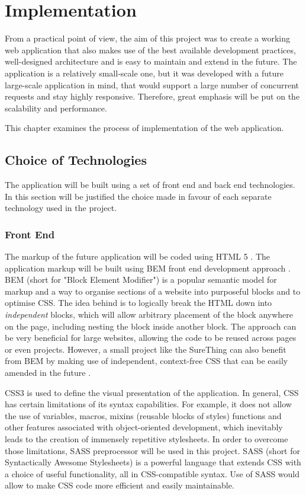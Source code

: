 \chapter{Implementation}
\label{ch:implementation}
From a practical point of view, the aim of this project was to create a working web application that also makes use of the best available development practices, well-designed architecture and is easy to maintain and extend in the future. The application is a relatively small-scale one, but it was developed with a future large-scale application in mind, that would support a large number of concurrent requests and stay highly responsive. Therefore, great emphasis will be put on the scalability and performance.  

This chapter examines the process of implementation of the web application. 

\section{Choice of Technologies}
\label{sec:choiceoftechnologies}
The application will be built using a set of front end and back end technologies. In this section will be justified the choice made in favour of each separate technology used in the project. 

\subsection{Front End}
The markup of the future application will be coded using HTML 5 \cite{documentation:HTML}. The application markup will be built using BEM front end development approach \cite{documentation:BEM}. BEM (short for "Block Element Modifier") is a popular semantic model for markup and a way to organise sections of a website into purposeful blocks and to optimise CSS. The idea behind is to logically break the HTML down into \emph{independent} blocks, which will allow arbitrary placement of the block anywhere on the page, including nesting the block inside another block. The approach can be  very beneficial for large websites, allowing the code to be reused across pages or even projects. However, a small project like the SureThing can also benefit from BEM by making use of independent, context-free CSS that can be easily amended in the future \cite{article:BEMForSmallProjects}.

CSS3 is used to define the visual presentation of the application. In general, CSS has certain limitations of its syntax capabilities. For example, it does not allow the use of variables, macros, mixins (reusable blocks of styles) functions and other features associated with object-oriented development, which inevitably leads to the creation of immensely repetitive stylesheets. In order to overcome those limitations, SASS preprocessor \cite{documentation:SASS} will be used in this project. SASS (short for Syntactically Awesome Stylesheets) is a powerful language that extends CSS with a choice of useful functionality, all in CSS-compatible syntax. Use of SASS would allow to make CSS code more efficient and easily maintainable. 

